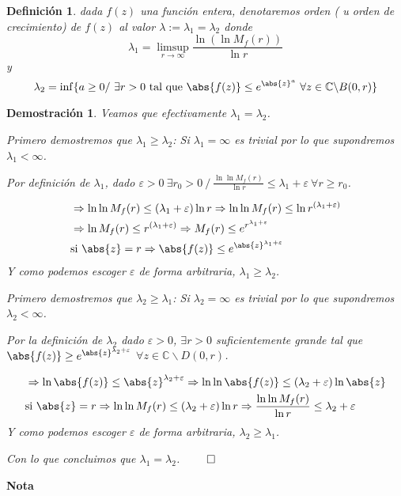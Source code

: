 \documentclass[10pt]{book}
\newtheorem{defi}{Definición}[chapter]
\newtheorem*{dem}{Demostración}
\newcommand{\C}{\mathbb{C}}
\begin{document}
\begin{defi}
dada $f(z)$ una función entera, denotaremos orden ( u orden de crecimiento) de $f(z)$ al valor $\lambda:=\lambda_1 = \lambda_2$ donde
$$
\lambda_1 = \limsup_{r\to \infty}\frac{\ln(\ln M_f(r))}{\ln r}
$$
y
$$
\lambda_2 = \inf\{a\geq 0 /\ \exists r >0 \text{ tal que } \abs{f(z)}\leq e^{\abs{z}^a}\ \forall z\in\C \backslash B(0,r)\}
$$
\end{defi}

\begin{dem} Veamos que efectivamente $\lambda_1 = \lambda_2$.

Primero demostremos que $\lambda_1 \geq \lambda_2$:
Si $\lambda_1 = \infty$ es trivial por lo que supondremos $\lambda_1<\infty$.

Por definición de $\lambda_1$, dado $\varepsilon >0\ \exists r_0>0\ /\  \frac{\ln\ln M_f(r)}{\ln r} \leq \lambda_1 + \varepsilon\ \forall r\geq r_0$.

\begin{align*}
& \Rightarrow \ln\ln M_f(r) \leq (\lambda_1+\varepsilon)\ln r \Rightarrow \ln\ln M_f(r) \leq \ln r^{(\lambda_1+\varepsilon)} \\
& \Rightarrow  \ln M_f(r) \leq r^{(\lambda_1+\varepsilon)}\Rightarrow M_f(r) \leq e^{r^{\lambda_1+\varepsilon}}\\
& \text{si } \abs{z} = r \Rightarrow \abs{f(z)} \leq e^{\abs{z}^{\lambda_1 + \varepsilon}}
\end{align*}
Y como podemos escoger $\varepsilon$ de forma arbitraria, $\lambda_1 \geq \lambda_2$.

Primero demostremos que $\lambda_2 \geq \lambda_1$:
Si $\lambda_2 = \infty$ es trivial por lo que supondremos $\lambda_2<\infty$.

Por la definición de $\lambda_2$ dado $\varepsilon>0$, $\exists r>0$ suficientemente grande tal que $\abs{f(z)}\geq e^{\abs{z}^{\lambda_2+\varepsilon}}$ $\forall z\in \C\backslash D(0,r)$.

\begin{align*}
&\Rightarrow \ln\abs{f(z)} \leq \abs{z}^{\lambda_2+\varepsilon} \Rightarrow \ln\ln \abs{f(z)} \leq (\lambda_2+\varepsilon)\ln\abs{z}\\
&\text{si }\abs{z}=r \Rightarrow \ln\ln M_f(r) \leq (\lambda_2+\varepsilon)\ln r \Rightarrow \frac{\ln\ln M_f(r)}{\ln r} \leq \lambda_2 + \varepsilon
\end{align*}
Y como podemos escoger $\varepsilon$ de forma arbitraria, $\lambda_2 \geq \lambda_1$.

Con lo que concluimos que $\lambda_1 =\lambda_2$. $\qed$

\end{dem}
\textbf{Nota}
\end{document}
